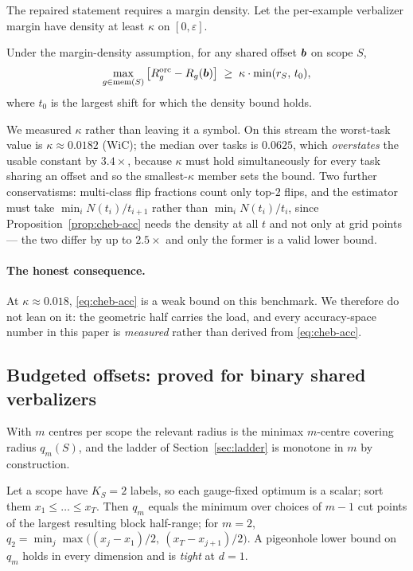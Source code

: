 The repaired statement requires a margin density. Let the per-example verbalizer
margin have density at least $\kappa$ on $[0,\varepsilon]$.

\begin{proposition}
\label{prop:cheb-acc}
Under the margin-density assumption, for any shared offset $\bm{b}$ on scope $S$,
\begin{equation}
  \max_{g\in\mathrm{mem}(S)}\big[R_g^{\mathrm{orc}}-R_g(\bm{b})\big]
  \;\ge\; \kappa\cdot\min(r_S,\,t_0),
  \label{eq:cheb-acc}
\end{equation}
where $t_0$ is the largest shift for which the density bound holds.
\end{proposition}

We measured $\kappa$ rather than leaving it a symbol. On this stream the
worst-task value is $\kappa\approx\mathbf{0.0182}$ (WiC); the median over tasks is
$0.0625$, which \emph{overstates} the usable constant by $3.4\times$, because
$\kappa$ must hold simultaneously for every task sharing an offset and so the
smallest-$\kappa$ member sets the bound. Two further conservatisms: multi-class
flip fractions count only top-$2$ flips, and the estimator must take
$\min_i N(t_i)/t_{i+1}$ rather than $\min_i N(t_i)/t_i$, since
Proposition~\ref{prop:cheb-acc} needs the density at all $t$ and not only at grid
points --- the two differ by up to $2.5\times$ and only the former is a valid lower
bound.

\paragraph{The honest consequence.}
At $\kappa\approx0.018$, \eqref{eq:cheb-acc} is a weak bound on this benchmark. We
therefore do not lean on it: the geometric half carries the load, and every
accuracy-space number in this paper is \emph{measured} rather than derived from
\eqref{eq:cheb-acc}.

\subsection{Budgeted offsets: proved for binary shared verbalizers}

With $m$ centres per scope the relevant radius is the minimax $m$-centre covering
radius $q_m(S)$, and the ladder of Section~\ref{sec:ladder} is monotone in $m$ by
construction.

\begin{proposition}[Closed form and pigeonhole bound, $d=1$]
\label{prop:qm}
Let a scope have $K_S=2$ labels, so each gauge-fixed optimum is a scalar; sort them
$x_1\le\dots\le x_T$. Then $q_m$ equals the minimum over choices of $m-1$ cut
points of the largest resulting block half-range; for $m=2$,
$q_2=\min_j\max\!\big((x_j-x_1)/2,\ (x_T-x_{j+1})/2\big)$. A pigeonhole lower bound
on $q_m$ holds in every dimension and is \emph{tight} at $d=1$.
\end{proposition}

